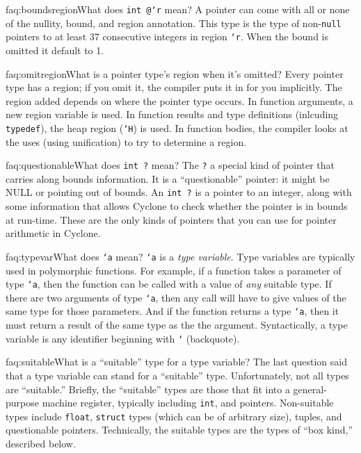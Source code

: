 \begin{faqa}{faq:boundsregion}{What does \texttt{int @\rb `r} mean?}
A pointer can come with all or none of the nullity, bound, and region
annotation.  This type is the type of non-\texttt{null} pointers to
at least 37 consecutive integers in region \texttt{`r}.  When the
bound is omitted it default to 1.
\end{faqa}

\begin{faqa}{faq:omitregion}{What is a pointer type's region when it's
omitted?} Every pointer type has a region; if you omit it, the
compiler puts it in for you implicitly.  The region added depends on
where the pointer type occurs.  In function arguments, a new region
variable is used.  In function results and type definitions (inlcuding
\texttt{typedef}), the heap region (\texttt{`H}) is used.  In function
bodies, the compiler looks at the uses (using unification) to try to
determine a region.
\end{faqa}

\begin{faqa}{faq:questionable}{What does \texttt{int ?} mean?}
The \texttt{?} a special kind of pointer that carries along bounds
information.  It is a ``questionable'' pointer: it might be NULL or
pointing out of bounds.  An \texttt{int ?} is a pointer to an integer,
along with some information that allows Cyclone to check whether the
pointer is in bounds at run-time.  These are the only kinds of
pointers that you can use for pointer arithmetic in Cyclone.
\end{faqa}

\begin{faqa}{faq:typevar}{What does \texttt{`a} mean?}
\texttt{`a} is a \emph{type variable}.  Type variables are typically
used in polymorphic functions.  For example, if a function takes a
parameter of type \texttt{`a}, then the function can be called with a
value of \emph{any} suitable type.  If there are two arguments of type
\texttt{`a}, then any call will have to give values of the same type
for those parameters.  And if the function returns a type \texttt{`a},
then it must return a result of the same type as the the argument.
Syntactically, a type variable is any identifier beginning with
\texttt{`} (backquote).
\end{faqa}

\begin{faqa}{faq:suitable}{What is a ``suitable'' type for a type variable?}
The last question said that a type variable can stand for a
``suitable'' type.  Unfortunately, not all types are ``suitable.''
Briefly, the ``suitable'' types are those that fit into a
general-purpose machine register, typically including \texttt{int},
and pointers.  Non-suitable types include \texttt{float}, \texttt{struct}
types (which can be of arbitrary size), tuples, and questionable
pointers.  Technically, the suitable types are the types of ``box
kind,'' described below.
\end{faqa}

